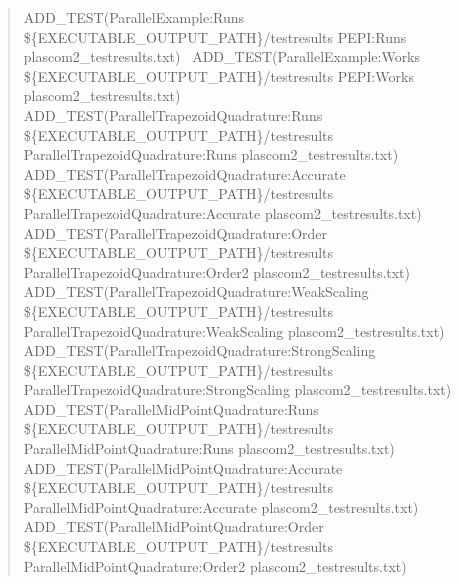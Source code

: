 \begin{quote}
A\+D\+D\+\_\+\+T\+E\+ST(Parallel\+Example\+:Runs \$\{E\+X\+E\+C\+U\+T\+A\+B\+L\+E\+\_\+\+O\+U\+T\+P\+U\+T\+\_\+\+P\+A\+TH\}/testresults P\+E\+PI\+:Runs plascom2\+\_\+testresults.\+txt)~\newline
A\+D\+D\+\_\+\+T\+E\+ST(Parallel\+Example\+:Works \$\{E\+X\+E\+C\+U\+T\+A\+B\+L\+E\+\_\+\+O\+U\+T\+P\+U\+T\+\_\+\+P\+A\+TH\}/testresults P\+E\+PI\+:Works plascom2\+\_\+testresults.\+txt)~\newline
A\+D\+D\+\_\+\+T\+E\+ST(Parallel\+Trapezoid\+Quadrature\+:Runs \$\{E\+X\+E\+C\+U\+T\+A\+B\+L\+E\+\_\+\+O\+U\+T\+P\+U\+T\+\_\+\+P\+A\+TH\}/testresults Parallel\+Trapezoid\+Quadrature\+:Runs plascom2\+\_\+testresults.\+txt)~\newline
A\+D\+D\+\_\+\+T\+E\+ST(Parallel\+Trapezoid\+Quadrature\+:Accurate \$\{E\+X\+E\+C\+U\+T\+A\+B\+L\+E\+\_\+\+O\+U\+T\+P\+U\+T\+\_\+\+P\+A\+TH\}/testresults Parallel\+Trapezoid\+Quadrature\+:Accurate plascom2\+\_\+testresults.\+txt)~\newline
A\+D\+D\+\_\+\+T\+E\+ST(Parallel\+Trapezoid\+Quadrature\+:Order \$\{E\+X\+E\+C\+U\+T\+A\+B\+L\+E\+\_\+\+O\+U\+T\+P\+U\+T\+\_\+\+P\+A\+TH\}/testresults Parallel\+Trapezoid\+Quadrature\+:Order2 plascom2\+\_\+testresults.\+txt)~\newline
A\+D\+D\+\_\+\+T\+E\+ST(Parallel\+Trapezoid\+Quadrature\+:Weak\+Scaling \$\{E\+X\+E\+C\+U\+T\+A\+B\+L\+E\+\_\+\+O\+U\+T\+P\+U\+T\+\_\+\+P\+A\+TH\}/testresults Parallel\+Trapezoid\+Quadrature\+:Weak\+Scaling plascom2\+\_\+testresults.\+txt)~\newline
A\+D\+D\+\_\+\+T\+E\+ST(Parallel\+Trapezoid\+Quadrature\+:Strong\+Scaling \$\{E\+X\+E\+C\+U\+T\+A\+B\+L\+E\+\_\+\+O\+U\+T\+P\+U\+T\+\_\+\+P\+A\+TH\}/testresults Parallel\+Trapezoid\+Quadrature\+:Strong\+Scaling plascom2\+\_\+testresults.\+txt)~\newline
A\+D\+D\+\_\+\+T\+E\+ST(Parallel\+Mid\+Point\+Quadrature\+:Runs \$\{E\+X\+E\+C\+U\+T\+A\+B\+L\+E\+\_\+\+O\+U\+T\+P\+U\+T\+\_\+\+P\+A\+TH\}/testresults Parallel\+Mid\+Point\+Quadrature\+:Runs plascom2\+\_\+testresults.\+txt)~\newline
A\+D\+D\+\_\+\+T\+E\+ST(Parallel\+Mid\+Point\+Quadrature\+:Accurate \$\{E\+X\+E\+C\+U\+T\+A\+B\+L\+E\+\_\+\+O\+U\+T\+P\+U\+T\+\_\+\+P\+A\+TH\}/testresults Parallel\+Mid\+Point\+Quadrature\+:Accurate plascom2\+\_\+testresults.\+txt)~\newline
A\+D\+D\+\_\+\+T\+E\+ST(Parallel\+Mid\+Point\+Quadrature\+:Order \$\{E\+X\+E\+C\+U\+T\+A\+B\+L\+E\+\_\+\+O\+U\+T\+P\+U\+T\+\_\+\+P\+A\+TH\}/testresults Parallel\+Mid\+Point\+Quadrature\+:Order2 plascom2\+\_\+testresults.\+txt)~\newline

\end{quote}
